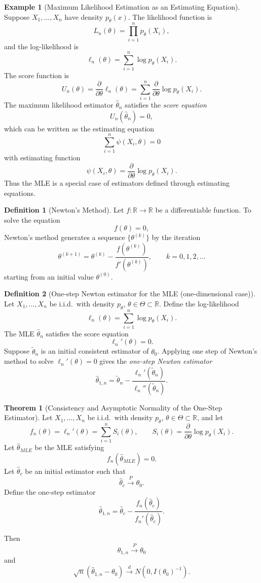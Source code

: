 \documentclass[11pt]{article}
\theoremstyle{definition}
\newtheorem{defn}{Definition}[section]
\newtheorem{exmp}{Example}[section]
\newtheorem{theo}{Theorem}[section]
\begin{document}
\begin{exmp}[Maximum Likelihood Estimation as an Estimating Equation]
Suppose $X_1,\dots,X_n$ have density $p_\theta(x)$.
The likelihood function is
\[
L_n(\theta)=\prod_{i=1}^{n} p_\theta(X_i),
\]
and the log-likelihood is
\[
\ell_n(\theta)=\sum_{i=1}^{n}\log p_\theta(X_i).
\]
The score function is
\[
U_n(\theta)
=
\frac{\partial}{\partial\theta}\ell_n(\theta)
=
\sum_{i=1}^{n}
\frac{\partial}{\partial\theta}\log p_\theta(X_i).
\]
The maximum likelihood estimator $\hat\theta_n$ satisfies the
\emph{score equation}
\[
U_n(\hat\theta_n)=0,
\]
which can be written as the estimating equation
\[
\sum_{i=1}^{n}\psi(X_i,\theta)=0
\]
with estimating function
\[
\psi(X_i,\theta)
=
\frac{\partial}{\partial\theta}\log p_\theta(X_i).
\]
Thus the MLE is a special case of estimators defined through
estimating equations.
\end{exmp}
\begin{defn}[Newton's Method]
Let $f:\mathbb{R}\to\mathbb{R}$ be a differentiable function. 
To solve the equation
\[
f(\theta)=0,
\]
Newton's method generates a sequence $\{\theta^{(k)}\}$ by the iteration
\[
\theta^{(k+1)}
=
\theta^{(k)}
-
\frac{f\!\left(\theta^{(k)}\right)}{f'\!\left(\theta^{(k)}\right)},
\qquad k=0,1,2,\dots
\]
starting from an initial value $\theta^{(0)}$.
\end{defn}
\begin{defn}[One-step Newton estimator for the MLE (one-dimensional case)]
Let $X_1,\dots,X_n$ be i.i.d.\ with density $p_\theta$, $\theta \in \Theta \subset \mathbb{R}$.
Define the log-likelihood
\[
\ell_n(\theta) = \sum_{i=1}^n \log p_\theta(X_i).
\]
The MLE $\hat{\theta}_n$ satisfies the score equation
\[
\ell_n'(\theta) = 0.
\]
Suppose $\tilde{\theta}_n$ is an initial consistent estimator of $\theta_0$.
Applying one step of Newton's method to solve $\ell_n'(\theta)=0$ gives the
\emph{one-step Newton estimator}
\[
\hat{\theta}_{1,n}
=
\tilde{\theta}_n
-
\frac{\ell_n'(\tilde{\theta}_n)}{\ell_n''(\tilde{\theta}_n)}.
\]
\end{defn}
\begin{theo}[Consistency and Asymptotic Normality of the One-Step Estimator]
Let $X_1,\dots,X_n$ be i.i.d.\ with density $p_\theta$, $\theta\in\Theta\subset\mathbb{R}$,
and let
\[
f_n(\theta)=\ell_n'(\theta)=\sum_{i=1}^n S_i(\theta),
\qquad
S_i(\theta)=\frac{\partial}{\partial\theta}\log p_\theta(X_i).
\]
Let $\hat\theta_{MLE}$ be the MLE satisfying
\[
f_n(\hat\theta_{MLE})=0 .
\]
Let $\hat\theta_c$ be an initial estimator such that
\[
\hat\theta_c \xrightarrow{P} \theta_0 .
\]
Define the one-step estimator
\[
\hat\theta_{1,n}
=
\hat\theta_c
-
\frac{f_n(\hat\theta_c)}{f_n'(\hat\theta_c)} .
\]

Then
\[
\hat\theta_{1,n} \xrightarrow{P} \theta_0
\]
and
\[
\sqrt n(\hat\theta_{1,n}-\theta_0)
\xrightarrow{d}
N\!\left(0,I(\theta_0)^{-1}\right).
\]
\end{theo}
\end{document}
